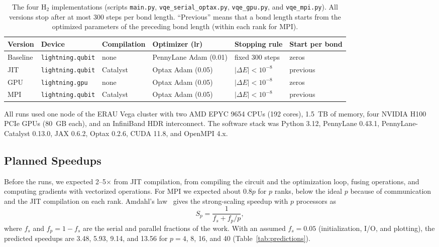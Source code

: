 \documentclass[11pt]{article}
\begin{document}
\begin{table}[t]
    \centering
    \small
    \setlength{\tabcolsep}{4pt}
    \begin{tabular}{llllll}
        \toprule
        Version & Device & Compilation & Optimizer (lr) & Stopping rule & Start per bond \\
        \midrule
        Baseline & \texttt{lightning.qubit} & none & PennyLane Adam (0.01) & fixed 300 steps & zeros \\
        JIT & \texttt{lightning.qubit} & Catalyst & Optax Adam (0.05) & $|\Delta E| < 10^{-8}$ & previous \\
        GPU & \texttt{lightning.gpu} & none & Optax Adam (0.05) & $|\Delta E| < 10^{-8}$ & zeros \\
        MPI & \texttt{lightning.qubit} & Catalyst & Optax Adam (0.05) & $|\Delta E| < 10^{-8}$ & previous \\
        \bottomrule
    \end{tabular}
    \caption{The four H$_2$ implementations (scripts \texttt{main.py}, \texttt{vqe\_serial\_optax.py}, \texttt{vqe\_gpu.py}, and \texttt{vqe\_mpi.py}). All versions stop after at most 300 steps per bond length. ``Previous'' means that a bond length starts from the optimized parameters of the preceding bond length (within each rank for MPI).}
    \label{tab:implementations}
\end{table}

All runs used one node of the ERAU Vega cluster with two AMD EPYC 9654 CPUs (192 cores), 1.5~TB of memory, four NVIDIA H100 PCIe GPUs (80~GB each), and an InfiniBand HDR interconnect. The software stack was Python 3.12, PennyLane 0.43.1, PennyLane-Catalyst 0.13.0, JAX 0.6.2, Optax 0.2.6, CUDA 11.8, and OpenMPI 4.x.

\subsection{Planned Speedups}
\label{sec:prediction}

Before the runs, we expected 2--5$\times$ from JIT compilation, from compiling the circuit and the optimization loop, fusing operations, and computing gradients with vectorized operations. For MPI we expected about $0.8p$ for $p$ ranks, below the ideal $p$ because of communication and the JIT compilation on each rank. Amdahl's law~\cite{amdahl1967} gives the strong-scaling speedup with $p$ processors as
\begin{equation}
    S_p = \frac{1}{f_s + f_p/p},
\end{equation}
where $f_s$ and $f_p = 1 - f_s$ are the serial and parallel fractions of the work. With an assumed $f_s = 0.05$ (initialization, I/O, and plotting), the predicted speedups are 3.48, 5.93, 9.14, and 13.56 for $p = 4$, 8, 16, and 40 (Table~\ref{tab:predictions}).
\end{document}
